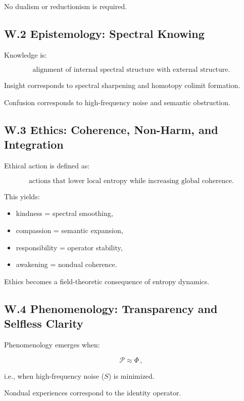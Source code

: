 \documentclass[12pt]{article}
\begin{document}
No dualism or reductionism is required.


\subsection*{W.2 Epistemology: Spectral Knowing}

Knowledge is:

\[
\text{alignment of internal spectral structure with external structure}.
\]

Insight corresponds to spectral sharpening and homotopy colimit formation.

Confusion corresponds to high-frequency noise and semantic obstruction.

\subsection*{W.3 Ethics: Coherence, Non-Harm, and Integration}

Ethical action is defined as:

\[
\text{actions that lower local entropy while increasing global coherence}.
\]

This yields:

\begin{itemize}
\item kindness = spectral smoothing,
\item compassion = semantic expansion,
\item responsibility = operator stability,
\item awakening = nondual coherence.
\end{itemize}

Ethics becomes a field-theoretic consequence of entropy dynamics.


\subsection*{W.4 Phenomenology: Transparency and Selfless Clarity}

Phenomenology emerges when:

\[
\mathcal{P} \approx \Phi\,,
\]

i.e., when high-frequency noise ($S$) is minimized.

Nondual experiences correspond to the identity operator.
\end{document}
